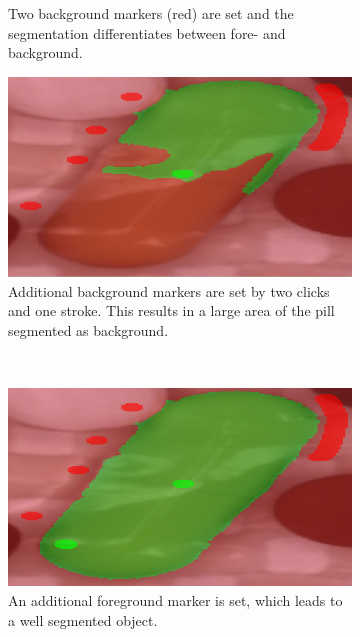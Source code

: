 \begin{figure}
\begin{subfigure}[t]{0.45\textwidth}
		\caption{
			Two background markers (red) are set and the segmentation differentiates between fore- and background.\\
		} \label{fig:ch3:sec3:application3}
	\end{subfigure}
	\hfill
	\begin{subfigure}[t]{0.45\textwidth}
		\centering
		\includegraphics[width=\textwidth]{figures/chap32_watershed_application4.png}
		\caption{
			Additional background markers are set by two clicks and one stroke. 
			This results in a large area of the pill segmented as background.
		} \label{fig:ch3:sec3:application4}
	\end{subfigure}
	\\
	\begin{subfigure}[t]{0.45\textwidth}
		\centering
		\includegraphics[width=\textwidth]{figures/chap32_watershed_application5.png}
		\caption{
			An additional foreground marker is set, which leads to a well segmented object.
		} \label{fig:ch3:sec3:application5}
	\end{subfigure}
	\hfill
	\begin{subfigure}[t]{0.45\textwidth}

\end{subfigure}
\end{figure}
